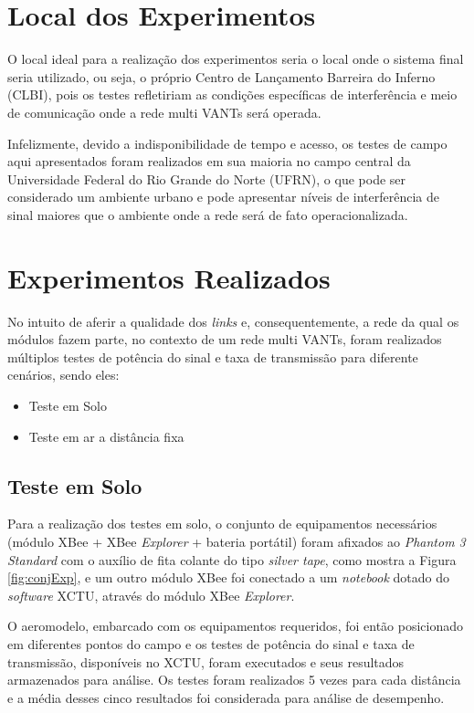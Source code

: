 \section{Local dos Experimentos}

O local ideal para a realização dos experimentos seria o local onde o sistema final seria utilizado, ou seja, o próprio Centro de Lançamento Barreira do Inferno (CLBI), pois os testes refletiriam as condições específicas de interferência e meio de comunicação onde a rede multi VANTs será operada.

Infelizmente, devido a indisponibilidade de tempo e acesso, os testes de campo aqui apresentados foram realizados em sua maioria no campo central da Universidade Federal do Rio Grande do Norte (UFRN), o que pode ser considerado um ambiente urbano e pode apresentar níveis de interferência de sinal maiores que o ambiente onde a rede será de fato operacionalizada. 

\section{Experimentos Realizados}

No intuito de aferir a qualidade dos \emph{links} e, consequentemente, a rede da qual os módulos fazem parte, no contexto de um rede multi VANTs, foram realizados múltiplos testes de potência do sinal e taxa de transmissão para diferente cenários, sendo eles:

\begin{itemize}
\item Teste em Solo
\item Teste em ar a distância fixa
\end{itemize} 

\subsection{Teste em Solo}

Para a realização dos testes em solo, o conjunto de equipamentos necessários (módulo XBee + XBee \emph{Explorer} + bateria portátil) foram afixados ao \emph{Phantom 3 Standard} com o auxílio de fita colante do tipo \emph{silver tape}, como mostra a Figura \ref{fig:conjExp}, e um outro módulo XBee foi conectado a um \emph{notebook} dotado do \emph{software} XCTU, através do módulo XBee \emph{Explorer}.

O aeromodelo, embarcado com os equipamentos requeridos, foi então posicionado em diferentes pontos do campo e os testes de potência do sinal e taxa de transmissão, disponíveis no XCTU, foram executados e seus resultados armazenados para análise. Os testes foram realizados 5 vezes para cada distância e a média desses cinco resultados foi considerada para análise de desempenho. 
 
